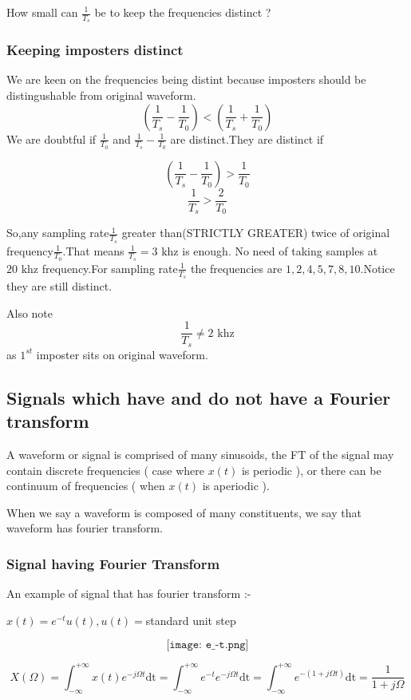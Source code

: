 How small can $\frac{1}{T_s}$ be to keep the frequencies distinct ?
\subsubsection{Keeping imposters distinct}

We are keen on the frequencies being distint because imposters should be distingushable from original waveform.
$$(\frac{1}{T_s} - \frac{1}{T_0} )<(\frac{1}{T_s} + \frac{1}{T_0})$$
We are doubtful if $\frac{1}{T_0}$ and $\frac{1}{T_s} - \frac{1}{T_0}$ are distinct.They are distinct if

 $$(\frac{1}{T_s} -\frac{1}{T_0} )> \frac{1}{T_0}$$
$$\frac{1}{T_s}>\frac{2}{T_0}$$


So,any sampling rate$\frac{1}{T_s}$ greater than(STRICTLY GREATER) twice of original frequency$\frac{1}{T_0}$.That means $\frac{1}{T_s}=3 \mbox{ khz}$ is enough. No need of taking samples at $20 \mbox{ khz}$ frequency.For sampling rate$\frac{1}{T_s}$ the frequencies are $1,2,4,5,7,8,10$.Notice they are still distinct. 

Also note $$\frac{1}{T_s} \neq 2 \mbox{ khz}$$ as $1^{st}$ imposter sits on original waveform.

\subsection{Signals which have and do not have a Fourier transform} 
A waveform or signal is comprised of many sinusoids, the FT of the signal may contain discrete frequencies ( case where $x(t)$ is periodic ), or there can be continuum of frequencies ( when $x(t)$ is aperiodic ).

When we say a waveform is composed of many constituents, we say that waveform has fourier transform.
\subsubsection{Signal having Fourier Transform}

An example of signal that has fourier transform :-

$x(t)=e^{-t}u(t),  
u(t)=$standard unit step



$$\texttt{[image: e\_-t.png]}$$



$$X(\Omega)= \int_{-\infty}^{+\infty} x(t)e^{-j\Omega t}\mbox{dt}=\int_{-\infty}^{+\infty} e^{-t}e^{-j\Omega t}\mbox{dt}= \int_{-\infty}^{+\infty} e^{-(1+j\Omega t)}\mbox{dt}= \frac{1}{1+j\Omega}$$


